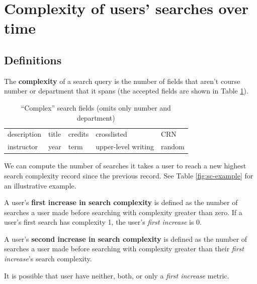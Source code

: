 
\section{Complexity of users' searches over time}

\subsection{Definitions}

The \textbf{complexity} of a search query is the number of fields that aren't course number or department that it spans (the accepted fields are shown in Table \ref{fig:sc-fields}).

\singlespacing
\begin{center}
\begin{table}[H]
  \centering
  \begin{tabular}{ lllll }

    \hline

    description
    & title
    & credits
    & crosslisted
    & CRN
    \\

    
    instructor
    & year
    & term
    & upper-level writing
    & random
    \\

    \hline

  \end{tabular}
  \vspace{10pt}
  \caption{``Complex'' search fields (omits only number and department)}
  \label{fig:sc-fields}
\end{table}
\end{center}
\doublespacing

\noindent We can compute the number of searches it takes a user to reach a new highest search complexity record since the previous record. See Table \ref{fig:sc-example} for an illustrative example.

A user's \textbf{first increase in search complexity} is defined as the number of searches a user made before searching with complexity greater than zero. If a user's first search has complexity 1, the user's \emph{first increase} is 0.

A user's \textbf{second increase in search complexity} is defined as the number of searches a user made before searching with complexity greater than their \emph{first increase}'s search complexity.

It is possible that user have neither, both, or only a \emph{first increase} metric.

